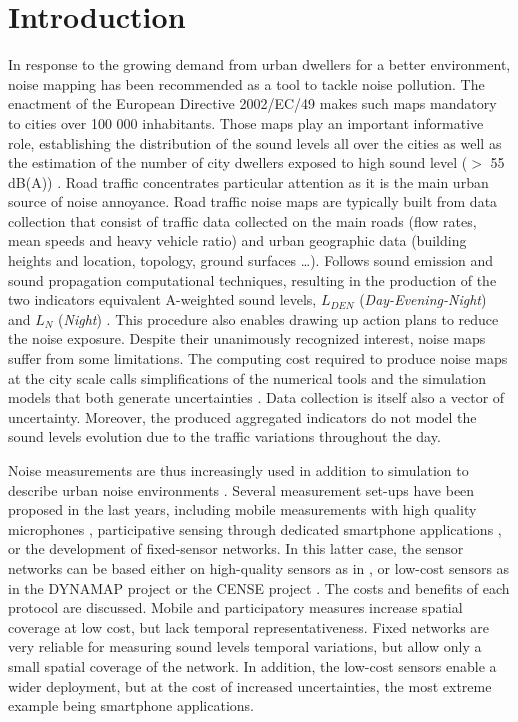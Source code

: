 \documentclass[review,5p,twocolumn,sort&compress,times]{elsarticle}
\begin{document}
\linenumbers

\section{Introduction}

In response to the growing demand from urban dwellers for a better environment, noise mapping has been recommended as a tool to tackle noise pollution. The enactment of the European Directive 2002/EC/49 makes such maps mandatory to cities over 100 000 inhabitants. Those maps play an important informative role, establishing the distribution of the sound levels all over the cities as well as the estimation of the number of city dwellers exposed to high sound level ($>$ 55 dB(A)) \cite{nugent2014noise}. Road traffic concentrates particular attention as it is the main urban source of noise annoyance. Road traffic noise maps are typically built from data collection that consist of traffic data collected on the main roads (flow rates, mean speeds and heavy vehicle ratio) and urban geographic data (building heights and location, topology, ground surfaces \dots). Follows sound emission and sound propagation computational techniques, resulting in the production of the two indicators equivalent A-weighted sound levels, $L_{DEN}$ (\textit{Day-Evening-Night}) and $L_N$ (\textit{Night}) \cite{kephalopoulos2012common}. This procedure also enables drawing up action plans to reduce the noise exposure. Despite their unanimously recognized interest, noise maps suffer from some limitations. The computing cost required to produce noise maps at the city scale calls simplifications of the numerical tools and the simulation models that both generate uncertainties \cite{arana2011precision,van_leeuwen_noise_2015}. Data collection is itself also a vector of uncertainty. Moreover, the produced aggregated indicators do not model the sound levels evolution due to the traffic variations throughout the day.

Noise measurements are thus increasingly used in addition to simulation to describe urban noise environments \cite{gozalo2016study,zannin2013characterization,can_exploring_2012}. Several measurement set-ups have been proposed in the last years, including  mobile measurements with high quality microphones \cite{manvell2004sadmam, can2014measurement}, participative sensing through dedicated smartphone applications \cite{picaut:halshs-01565214, ventura2017evaluation}, or the development of fixed-sensor networks. In this latter case, the sensor networks can be based either on high-quality sensors as in \cite{mietlicki2012innovative, maijala2018environmental}, or low-cost sensors as in the DYNAMAP project \cite{dynamap_2016} or the CENSE project \cite{picaut2017characterization}. The costs and benefits of each protocol are discussed. Mobile and participatory measures increase spatial coverage at low cost, but lack temporal representativeness. Fixed networks are very reliable for measuring sound levels temporal variations, but allow only a small spatial coverage of the network. In addition, the low-cost sensors enable a wider deployment, but at the cost of increased uncertainties, the most extreme example being smartphone applications.
\end{document}
